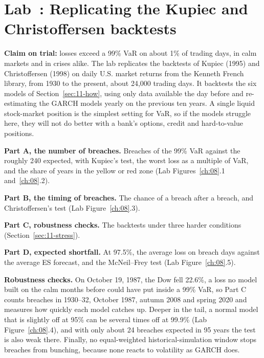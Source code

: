 \section{Lab~\thechapter: Replicating the Kupiec and Christoffersen backtests}
\label{sec:11-lab}

\textbf{Claim on trial:} losses exceed a 99\% VaR on about 1\% of trading days, in calm markets and in crises alike. The lab replicates the backtests of Kupiec (1995) and Christoffersen (1998) on daily U.S. market returns from the Kenneth French library, from 1930 to the present, about 24,000 trading days. It backtests the six models of Section~\ref{sec:11-how}, using only data available the day before and re-estimating the GARCH models yearly on the previous ten years. A single liquid stock-market position is the simplest setting for VaR, so if the models struggle here, they will not do better with a bank's options, credit and hard-to-value positions.

\textbf{Part A, the number of breaches.} Breaches of the 99\% VaR against the roughly 240 expected, with Kupiec's test, the worst loss as a multiple of VaR, and the share of years in the yellow or red zone (Lab Figures~\ref{ch:08}.1 and~\ref{ch:08}.2).

\textbf{Part B, the timing of breaches.} The chance of a breach after a breach, and Christoffersen's test (Lab Figure~\ref{ch:08}.3).

\textbf{Part C, robustness checks.} The backtests under three harder conditions (Section~\ref{sec:11-stress}).

\textbf{Part D, expected shortfall.} At 97.5\%, the average loss on breach days against the average ES forecast, and the McNeil--Frey test (Lab Figure~\ref{ch:08}.5).

\label{sec:11-stress}
\textbf{Robustness checks.} On October 19, 1987, the Dow fell 22.6\%, a loss no model built on the calm months before could have put inside a 99\% VaR, so Part C counts breaches in 1930--32, October 1987, autumn 2008 and spring 2020 and measures how quickly each model catches up. Deeper in the tail, a normal model that is slightly off at 95\% can be several times off at 99.9\% (Lab Figure~\ref{ch:08}.4), and with only about 24 breaches expected in 95 years the test is also weak there. Finally, no equal-weighted historical-simulation window stops breaches from bunching, because none reacts to volatility as GARCH does.

